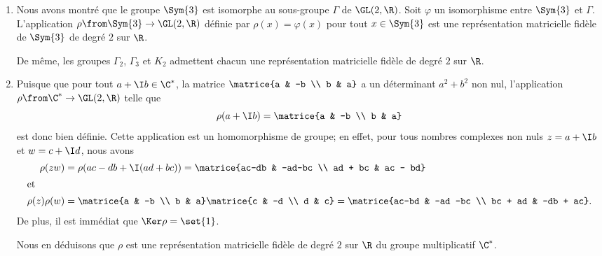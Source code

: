 \begin{enumerate}
  \item
    Nous avons montré que le groupe $\Sym{3}$ est isomorphe au sous-groupe $\Gamma$ de $\GL(2,\R)$.
    Soit $\varphi$ un isomorphisme entre $\Sym{3}$ et $\Gamma$.
    L'application $\rho\from\Sym{3}\to\GL(2,\R)$ définie par $\rho(x) = \varphi(x)$ pour tout $x\in\Sym{3}$ est une représentation matricielle fidèle de $\Sym{3}$ de degré $2$ sur $\R$.

    De même, les groupes $\Gamma_2$, $\Gamma_3$ et $K_2$ admettent chacun une représentation matricielle fidèle de degré $2$ sur $\R$.

  \item
    Puisque que pour tout $a+\I b\in\C^*$, la matrice $\matrice{a & -b \\ b & a}$ a un déterminant $a^2+b^2$ non nul, l'application $\rho\from\C^*\to\GL(2,\R)$ telle que
    \[
      \rho(a+\I b) = \matrice{a & -b \\ b & a}
    \]
    est donc bien définie.
    Cette application est un homomorphisme de groupe; en effet, pour tous nombres complexes non nuls $z = a+\I b$ et $w = c+\I d$, nous avons
    \begin{align*}
      \rho(zw)
        &= \rho(ac-db + \I (ad + bc))
         = \matrice{ac-db & -ad-bc \\ ad + bc & ac - bd} \\
      \intertext{et}
      \rho(z)\rho(w)
        &= \matrice{a & -b \\ b & a}\matrice{c & -d \\ d & c}
         = \matrice{ac-bd & -ad -bc \\ bc + ad & -db + ac}.
    \end{align*}
    De plus, il est immédiat que $\Ker \rho = \set{1}$.

    Nous en déduisons que $\rho$ est une représentation matricielle fidèle de degré $2$ sur $\R$  du groupe multiplicatif $\C^*$.
\end{enumerate}


